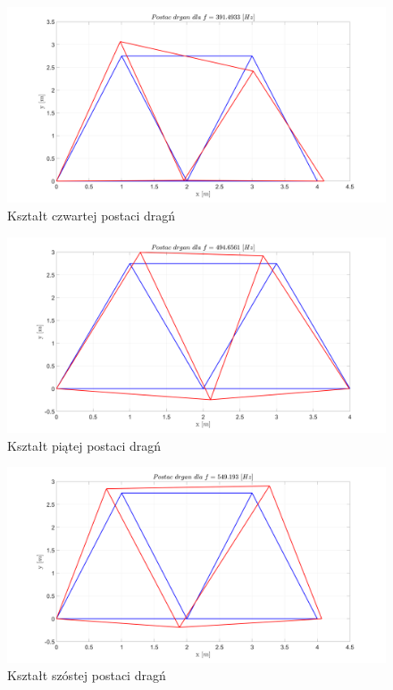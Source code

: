 \documentclass[12pt, a4papper, twoside]{article}
\begin{document}
\begin{figure}[H]
    \centering
    \includegraphics[width=\textwidth, height=0.6\textwidth]{postac_dragn_4.png}
    \caption{Kształt czwartej postaci dragń}
    \label{postac4}
\end{figure}

\begin{figure}[H]
    \centering
    \includegraphics[width=\textwidth, height=0.6\textwidth]{postac_dragn_5.png}
    \caption{Kształt piątej postaci dragń}
    \label{postac5}
\end{figure}

\begin{figure}[H]
    \centering
    \includegraphics[width=\textwidth, height=0.6\textwidth]{postac_dragn_6.png}
    \caption{Kształt szóstej postaci dragń}
    \label{postac6}
\end{figure}
\end{document}
